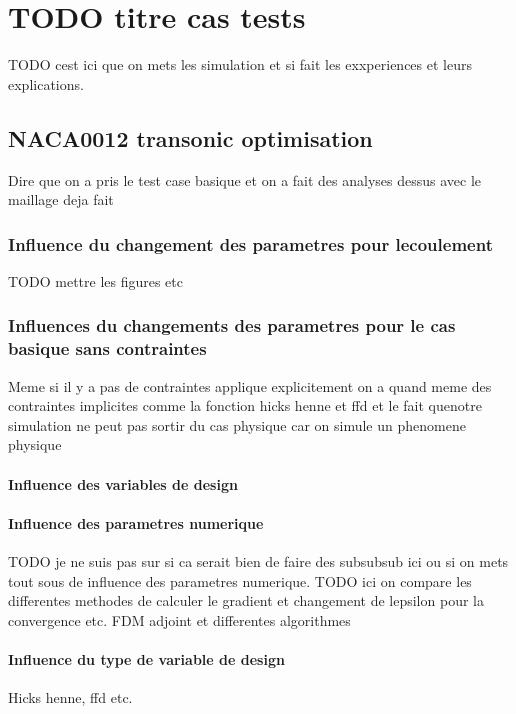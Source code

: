 \chapter{TODO titre cas tests}
TODO cest ici que on mets les simulation et si fait les exxperiences et leurs explications.

\section{NACA0012 transonic optimisation}

Dire que on a pris le test case basique et on a fait des analyses dessus avec le maillage deja fait

\subsection{Influence du changement des parametres pour lecoulement }
TODO mettre les figures etc

\subsection{Influences du changements des parametres pour le cas basique sans contraintes}
Meme si il y a pas de contraintes applique explicitement on a quand meme des contraintes implicites comme la fonction hicks henne et ffd et le fait quenotre simulation ne peut pas sortir du cas physique car on simule un phenomene physique
\subsubsection{Influence des variables de design}


\subsubsection{Influence des parametres numerique}
TODO je ne suis pas sur si ca serait bien de faire des subsubsub ici ou si on mets tout sous de influence des parametres numerique.
TODO ici on compare les differentes methodes de calculer le gradient et changement de lepsilon pour la convergence etc.
FDM adjoint et differentes algorithmes

\subsubsection{Influence du type de variable de design}
Hicks henne, ffd etc.

